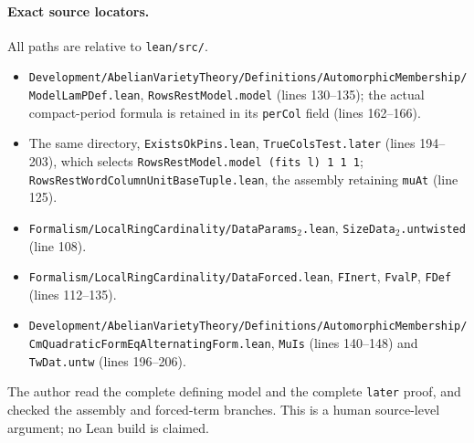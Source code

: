\paragraph{Exact source locators.}
All paths are relative to \texttt{lean/src/}.
\begin{itemize}
\item \texttt{Development/AbelianVarietyTheory/Definitions/AutomorphicMembership/
ModelLamPDef.lean}, \texttt{RowsRestModel.model} (lines 130--135);
the actual compact-period formula is retained in its
\texttt{perCol} field (lines 162--166).
\item The same directory, \texttt{ExistsOkPins.lean},
\texttt{TrueColsTest.later} (lines 194--203), which selects
\texttt{RowsRestModel.model (fits l) 1 1 1};
\texttt{RowsRestWordColumnUnitBaseTuple.lean}, the assembly
retaining \texttt{muAt} (line 125).
\item \texttt{Formalism/LocalRingCardinality/DataParams$_2$.lean},
\texttt{SizeData$_2$.untwisted} (line 108).
\item \texttt{Formalism/LocalRingCardinality/DataForced.lean},
\texttt{FInert}, \texttt{FvalP}, \texttt{FDef}
(lines 112--135).
\item \texttt{Development/AbelianVarietyTheory/Definitions/AutomorphicMembership/
CmQuadraticFormEqAlternatingForm.lean}, \texttt{MuIs}
(lines 140--148) and \texttt{TwDat.untw} (lines 196--206).
\end{itemize}
The author read the complete defining model and the complete
\texttt{later} proof, and checked the assembly and forced-term
branches.  This is a human source-level argument; no Lean build is
claimed.
